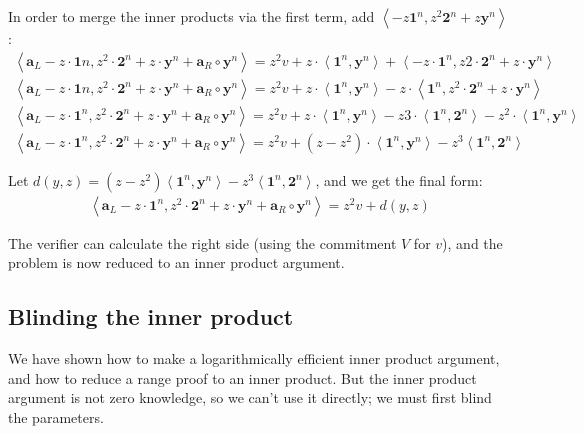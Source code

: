 \documentclass{article}
\begin{document}
In order to merge the inner products via the first term, add $\left<-z \textbf{1}^n, z^2 \textbf{2}^n + z \textbf{y}^n\right>$:
\begin{align}
  \left<\textbf{a}_L - z \cdot \textbf{1}n, z^2 \cdot \textbf{2}^n + z \cdot \textbf{y}^n + \textbf{a}_R \circ \textbf{y}^n\right> = z^2 v + z \cdot \left<\textbf{1}^n, \textbf{y}^n\right> + \left<-z \cdot \textbf{1}^n, z2 \cdot \textbf{2}^n + z \cdot \textbf{y}^n\right>\\
  \left<\textbf{a}_L - z \cdot \textbf{1}n, z^2 \cdot \textbf{2}^n + z \cdot \textbf{y}^n + \textbf{a}_R \circ \textbf{y}^n\right> = z^2 v + z \cdot \left<\textbf{1}^n, \textbf{y}^n\right> - z \cdot \left<\textbf{1}^n, z^2 \cdot \textbf{2}^n + z \cdot \textbf{y}^n\right>\\
  \left<\textbf{a}_L - z \cdot \textbf{1}^n, z^2 \cdot \textbf{2}^n + z \cdot \textbf{y}^n + \textbf{a}_R \circ \textbf{y}^n\right> = z^2 v + z \cdot \left<\textbf{1}^n, \textbf{y}^n\right> - z3 \cdot \left<\textbf{1}^n, \textbf{2}^n\right> - z^2 \cdot \left<\textbf{1}^n, \textbf{y}^n\right>\\
  \left<\textbf{a}_L - z \cdot \textbf{1}^n, z^2 \cdot \textbf{2}^n + z \cdot \textbf{y}^n + \textbf{a}_R \circ \textbf{y}^n\right> = z^2 v + (z - z^2) \cdot \left<\textbf{1}^n, \textbf{y}^n\right> - z^3 \left<\textbf{1}^n, \textbf{2}^n\right>
\end{align}
  
Let $d(y,z) = (z - z^2) \left<\textbf{1}^n, \textbf{y}^n\right> - z^3 \left<\textbf{1}^n, \textbf{2}^n\right>$, and we get the final form:
\begin{align}
  \left<\textbf{a}_L - z \cdot \textbf{1}^n, z^2 \cdot \textbf{2}^n + z \cdot \textbf{y}^n + \textbf{a}_R \circ \textbf{y}^n\right> = z^2 v + d(y,z)
\end{align}

The verifier can calculate the right side (using the commitment $V$ for $v$), and the problem is now reduced to an inner product argument.


\subsection{Blinding the inner product}

We have shown how to make a logarithmically efficient inner product argument, and how to reduce a range proof to an inner product.  But the inner product argument is not zero knowledge, so we can't use it directly; we must first blind the parameters.
\end{document}
